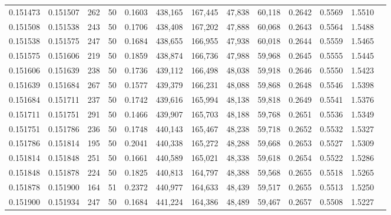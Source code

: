 \begin{tabular}{rrrrrrrrrrrrr}
0.151473 & 0.151507 &   262 &  50 &                                     0.1603 & 438,165 & 167,445 &  47,838 &  60,118 & 0.2642 & 0.5569 & 1.5510 \\
0.151508 & 0.151538 &   243 &  50 &                                     0.1706 & 438,408 & 167,202 &  47,888 &  60,068 & 0.2643 & 0.5564 & 1.5488 \\
0.151538 & 0.151575 &   247 &  50 &                                     0.1684 & 438,655 & 166,955 &  47,938 &  60,018 & 0.2644 & 0.5559 & 1.5465 \\
0.151575 & 0.151606 &   219 &  50 &                                     0.1859 & 438,874 & 166,736 &  47,988 &  59,968 & 0.2645 & 0.5555 & 1.5445 \\
0.151606 & 0.151639 &   238 &  50 &                                     0.1736 & 439,112 & 166,498 &  48,038 &  59,918 & 0.2646 & 0.5550 & 1.5423 \\
0.151639 & 0.151684 &   267 &  50 &                                     0.1577 & 439,379 & 166,231 &  48,088 &  59,868 & 0.2648 & 0.5546 & 1.5398 \\
0.151684 & 0.151711 &   237 &  50 &                                     0.1742 & 439,616 & 165,994 &  48,138 &  59,818 & 0.2649 & 0.5541 & 1.5376 \\
0.151711 & 0.151751 &   291 &  50 &                                     0.1466 & 439,907 & 165,703 &  48,188 &  59,768 & 0.2651 & 0.5536 & 1.5349 \\
0.151751 & 0.151786 &   236 &  50 &                                     0.1748 & 440,143 & 165,467 &  48,238 &  59,718 & 0.2652 & 0.5532 & 1.5327 \\
0.151786 & 0.151814 &   195 &  50 &                                     0.2041 & 440,338 & 165,272 &  48,288 &  59,668 & 0.2653 & 0.5527 & 1.5309 \\
0.151814 & 0.151848 &   251 &  50 &                                     0.1661 & 440,589 & 165,021 &  48,338 &  59,618 & 0.2654 & 0.5522 & 1.5286 \\
0.151848 & 0.151878 &   224 &  50 &                                     0.1825 & 440,813 & 164,797 &  48,388 &  59,568 & 0.2655 & 0.5518 & 1.5265 \\
0.151878 & 0.151900 &   164 &  51 &                                     0.2372 & 440,977 & 164,633 &  48,439 &  59,517 & 0.2655 & 0.5513 & 1.5250 \\
0.151900 & 0.151934 &   247 &  50 &                                     0.1684 & 441,224 & 164,386 &  48,489 &  59,467 & 0.2657 & 0.5508 & 1.5227 \\

\end{tabular}
